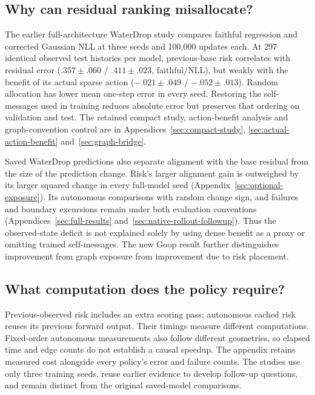 \subsection{Why can residual ranking misallocate?}
The earlier full-architecture WaterDrop study compares faithful regression and corrected Gaussian NLL at three seeds and 100,000 updates each. At 297 identical observed test histories per model, previous-base risk correlates with residual error ($.357\pm.060$ / $.411\pm.023$, faithful/NLL), but weakly with the benefit of its actual sparse action ($-.021\pm.049$ / $-.052\pm.013$). Random allocation has lower mean one-step error in every seed. Restoring the self-messages used in training reduces absolute error but preserves that ordering on validation and test. The retained compact study, action-benefit analysis and graph-convention control are in Appendices~\ref{sec:compact-study}, \ref{sec:actual-action-benefit} and~\ref{sec:graph-bridge}.

Saved WaterDrop predictions also separate alignment with the base residual from the size of the prediction change. Risk's larger alignment gain is outweighed by its larger squared change in every full-model seed (Appendix~\ref{sec:optional-exposure}). Its autonomous comparisons with random change sign, and failures and boundary excursions remain under both evaluation conventions (Appendices~\ref{sec:full-results} and~\ref{sec:native-rollout-followup}). Thus the observed-state deficit is not explained solely by using dense benefit as a proxy or omitting trained self-messages. The new Goop result further distinguishes improvement from graph exposure from improvement due to risk placement.

\subsection{What computation does the policy require?}
Previous-observed risk includes an extra scoring pass; autonomous cached risk reuses its previous forward output. Their timings measure different computations. Fixed-order autonomous measurements also follow different geometries, so elapsed time and edge counts do not establish a causal speedup. The appendix retains measured cost alongside every policy's error and failure counts. The studies use only three training seeds, reuse earlier evidence to develop follow-up questions, and remain distinct from the original saved-model comparisons.
